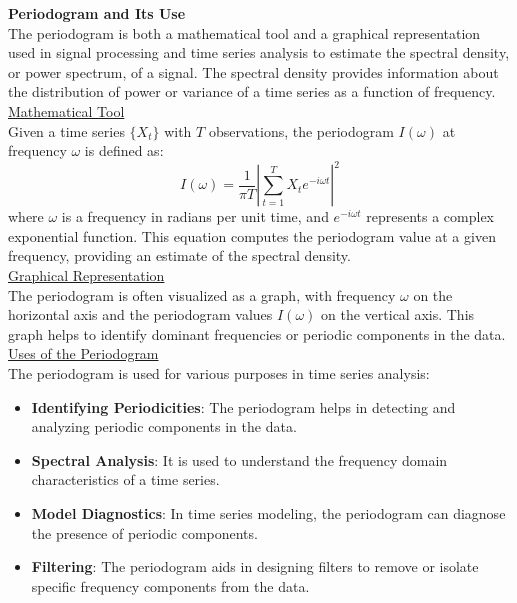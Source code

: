 \textbf{Periodogram and Its Use}\\

The periodogram is both a mathematical tool and a graphical representation used in signal processing and time series analysis to estimate the spectral density, or power spectrum, of a signal. The spectral density provides information about the distribution of power or variance of a time series as a function of frequency.\\

\underline{Mathematical Tool}\\

Given a time series \( \{X_t\} \) with \( T \) observations, the periodogram \( I(\omega) \) at frequency \( \omega \) is defined as:
\[
I(\omega) = \frac{1}{\pi T} \left| \sum_{t=1}^T X_t e^{-i \omega t} \right|^2
\]
where \( \omega \) is a frequency in radians per unit time, and \( e^{-i \omega t} \) represents a complex exponential function. This equation computes the periodogram value at a given frequency, providing an estimate of the spectral density. \\

\underline{Graphical Representation}\\

The periodogram is often visualized as a graph, with frequency \( \omega \) on the horizontal axis and the periodogram values \( I(\omega) \) on the vertical axis. This graph helps to identify dominant frequencies or periodic components in the data.\\



\underline{Uses of the Periodogram}\\

The periodogram is used for various purposes in time series analysis:

\begin{itemize}
    \item \textbf{Identifying Periodicities}: The periodogram helps in detecting and analyzing periodic components in the data.
    \item \textbf{Spectral Analysis}: It is used to understand the frequency domain characteristics of a time series.
    \item \textbf{Model Diagnostics}: In time series modeling, the periodogram can diagnose the presence of periodic components.
    \item \textbf{Filtering}: The periodogram aids in designing filters to remove or isolate specific frequency components from the data.
\end{itemize}

